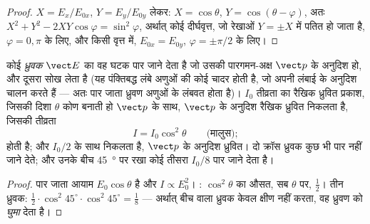 \begin{proof}
$X = E_x/E_{0x}$, $Y = E_y/E_{0y}$ लेकर: $X = \cos\theta$, $Y = \cos(\theta - \varphi)$, अतः
$X^2 + Y^2 - 2XY\cos\varphi = \sin^2\varphi$, अर्थात् कोई दीर्घवृत्त, जो रेखाओं
$Y = \pm X$ में पतित हो जाता है, $\varphi = 0, \pi$ के लिए, और किसी वृत्त में, $E_{0x} = E_{0y}$,
$\varphi = \pm\pi/2$ के लिए।
\end{proof}

\begin{proposition}[ध्रुवक और मालुस का नियम]\label{prop:b2:plane-waves-polarization:malus}
कोई \emph{ध्रुवक} $\vect E$ का वह घटक पार जाने देता है जो उसकी
पारगमन-अक्ष $\vect p$ के अनुदिश हो, और दूसरा सोख लेता है (यह पंक्तिबद्ध
लंबे अणुओं की कोई चादर होती है, जो अपनी लंबाई के अनुदिश चालन करते हैं ---
अतः पार जाता ध्रुवण अणुओं के लंबवत होता है)। $I_0$ तीव्रता का रैखिक
ध्रुवित प्रकाश, जिसकी दिशा $\theta$ कोण बनाती हो $\vect p$ के साथ,
$\vect p$ के अनुदिश रैखिक ध्रुवित निकलता है, जिसकी तीव्रता
\[
I = I_0\cos^2\theta \qquad\text{(मालुस)} ;
\]
होती है; और  $I_0/2$ के साथ निकलता है, $\vect p$ के अनुदिश ध्रुवित। दो
क्रॉस ध्रुवक कुछ भी पार नहीं जाने देते; और उनके बीच
\qty{45}{\degree} पर रखा कोई तीसरा $I_0/8$ पार जाने देता है।
\end{proposition}

\begin{proof}
पार जाता आयाम $E_0\cos\theta$ है और $I \propto E_0^2$। : $\cos^2\theta$ का औसत, सब $\theta$ पर, $\tfrac12$। तीन ध्रुवक:
$\tfrac12\cdot\cos^2 45^\circ\cdot\cos^2 45^\circ = \tfrac18$ --- अर्थात् बीच वाला
ध्रुवक केवल क्षीण नहीं करता, वह ध्रुवण को \emph{घुमा} देता है।
\end{proof}

